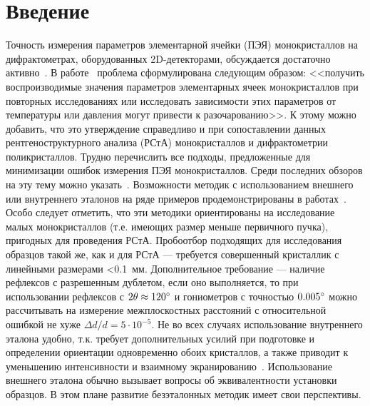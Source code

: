 \section{Введение}

Точность измерения параметров элементарной ячейки (ПЭЯ) монокристаллов на дифрактометрах, оборудованных 2D-детекторами, обсуждается достаточно активно~\cite{Herbstein:2000,Waterman:2010,Dudka:2010,Henn:2019,Taylor:1986,Serebrennikova:2021}.
В работе~\cite{Dudka:2017} проблема сформулирована следующим образом: << получить воспроизводимые значения параметров элементарных ячеек монокристаллов при повторных исследованиях или исследовать зависимости этих параметров от температуры или давления могут привести к разочарованию>>.
К этому можно добавить, что это утверждение справедливо и при сопоставлении данных рентгеноструктурного анализа (РСтА) монокристаллов и дифрактометрии поликристаллов.
Трудно перечислить все подходы, предложенные для минимизации ошибок измерения ПЭЯ монокристаллов.
Среди последних обзоров на эту тему можно указать~\cite{Galdecka:2006,Lider:2020}.
Возможности методик с использованием внешнего или внутреннего эталонов на ряде примеров продемонстрированы в работах~\cite{Gromilov:2022,Panchenko:2022,Panchenko:2023,Serebrennikova:2023,Serebrennikova:2022}.
Особо следует отметить, что эти методики ориентированы на исследование малых монокристаллов (т.е. имеющих размер меньше первичного пучка), пригодных для проведения РСтА.
Пробоотбор подходящих для исследования образцов такой же, как и для РСтА --- требуется совершенный кристаллик с линейными размерами <0.1~мм.
Дополнительное требование --- наличие рефлексов с разрешенным дублетом, если оно выполняется, то при использовании рефлексов с $2\theta \approx 120^\circ$ и гониометров с точностью $0.005^\circ$ можно рассчитывать на измерение межплоскостных расстояний с относительной ошибкой не хуже $\Delta d / d = 5 \cdot 10^{-5}$.
Не во всех случаях использование внутреннего эталона удобно, т.к. требует дополнительных усилий при подготовке и определении ориентации одновременно обоих кристаллов, а также приводит к уменьшению интенсивности и взаимному экранированию~\cite{Serebrennikova:2022}.
Использование внешнего эталона обычно вызывает вопросы об эквивалентности установки образцов.
В этом плане развитие безэталонных методик имеет свои перспективы.

